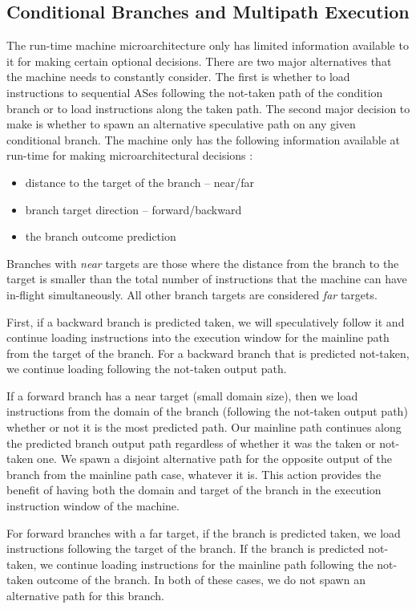 \documentclass[10pt,dvips]{article}
\begin{document}
\subsection{Conditional Branches and Multipath Execution}
%
The run-time machine microarchitecture only has limited information
available to it for making certain optional decisions.
There are two major alternatives that the machine needs to constantly
consider.  The first is whether to load instructions to sequential
ASes following
the not-taken path of the condition branch or to load instructions
along the taken path.  
The second major decision to make is
whether to spawn an alternative speculative path
on any given conditional branch.
The machine only has the following information
available at run-time for making microarchitectural decisions :
%
\begin{itemize}
\item{distance to the target of the branch -- near/far}
\item{branch target direction -- forward/backward}
\item{the branch outcome prediction}
\end{itemize}   
%
Branches with \textit{near} targets are those where
the distance from the branch to the target is smaller than
the total number of instructions that the machine can have
in-flight simultaneously.  All other branch targets are considered
\textit{far} targets.

First, if a backward branch is predicted taken,
we will speculatively follow it and continue loading instructions
into the execution window for the mainline path from the target
of the branch.  
For a backward branch that
is predicted not-taken, we continue loading following the
not-taken output path.

If a forward branch has a near target (small domain size), then we
load instructions from the domain of the branch (following the
not-taken output path) whether or not it is the most predicted path.
Our mainline path continues along the predicted branch output path
regardless of whether it was the taken or not-taken one.  
We spawn a disjoint
alternative path for the opposite output of the branch from
the mainline path case, whatever it is.
This action
provides the benefit of having both the domain and target of the branch
in the execution instruction window of the machine.  

For forward branches with a far target,
if the branch is predicted taken, we load instructions following the target
of the branch.  If the branch is predicted not-taken, we continue
loading instructions for the mainline path following the not-taken
outcome of the branch.  In both of these cases, we do not
spawn an alternative path for this branch.
%
%
%
\end{document}
